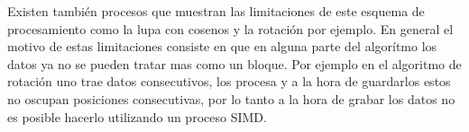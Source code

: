 Existen también procesos que muestran las limitaciones de este esquema de procesamiento como la lupa con cosenos y la rotación por ejemplo. En general el motivo de estas limitaciones
consiste en que en alguna parte del algorítmo los datos ya no se pueden
tratar mas como un bloque. Por ejemplo en el algoritmo de rotación
uno trae datos consecutivos, los procesa y a la hora de guardarlos
estos no oscupan posiciones consecutivas, por lo tanto a la hora
de grabar los datos no es posible hacerlo utilizando un proceso SIMD.